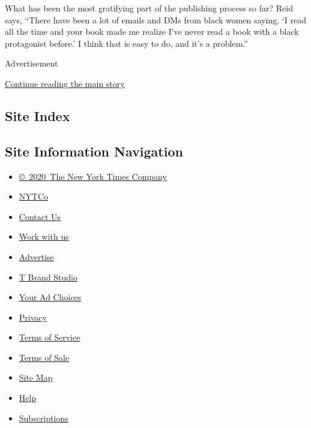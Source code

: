 What has been the most gratifying part of the publishing process so far?
Reid says, ``There have been a lot of emails and DMs from black women
saying, `I read all the time and your book made me realize I've never
read a book with a black protagonist before.' I think that is easy to
do, and it's a problem.''

Advertisement

\protect\hyperlink{after-bottom}{Continue reading the main story}

\hypertarget{site-index}{%
\subsection{Site Index}\label{site-index}}

\hypertarget{site-information-navigation}{%
\subsection{Site Information
Navigation}\label{site-information-navigation}}

\begin{itemize}
\tightlist
\item
  \href{https://help.nytimes.com/hc/en-us/articles/115014792127-Copyright-notice}{©~2020~The
  New York Times Company}
\end{itemize}

\begin{itemize}
\tightlist
\item
  \href{https://www.nytco.com/}{NYTCo}
\item
  \href{https://help.nytimes.com/hc/en-us/articles/115015385887-Contact-Us}{Contact
  Us}
\item
  \href{https://www.nytco.com/careers/}{Work with us}
\item
  \href{https://nytmediakit.com/}{Advertise}
\item
  \href{http://www.tbrandstudio.com/}{T Brand Studio}
\item
  \href{https://www.nytimes.com/privacy/cookie-policy\#how-do-i-manage-trackers}{Your
  Ad Choices}
\item
  \href{https://www.nytimes.com/privacy}{Privacy}
\item
  \href{https://help.nytimes.com/hc/en-us/articles/115014893428-Terms-of-service}{Terms
  of Service}
\item
  \href{https://help.nytimes.com/hc/en-us/articles/115014893968-Terms-of-sale}{Terms
  of Sale}
\item
  \href{https://spiderbites.nytimes.com}{Site Map}
\item
  \href{https://help.nytimes.com/hc/en-us}{Help}
\item
  \href{https://www.nytimes.com/subscription?campaignId=37WXW}{Subscriptions}
\end{itemize}
